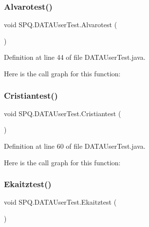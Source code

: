 \subsubsection{\texorpdfstring{Alvarotest()}{Alvarotest()}}
{\footnotesize\ttfamily void S\+P\+Q.\+D\+A\+T\+A\+User\+Test.\+Alvarotest (\begin{DoxyParamCaption}{ }\end{DoxyParamCaption})}



Definition at line 44 of file D\+A\+T\+A\+User\+Test.\+java.

Here is the call graph for this function\+:
\mbox{\label{class_s_p_q_1_1_d_a_t_a_user_test_a7defc94d9391e6721dee5c627f75e1fb}} 
\subsubsection{\texorpdfstring{Cristiantest()}{Cristiantest()}}
{\footnotesize\ttfamily void S\+P\+Q.\+D\+A\+T\+A\+User\+Test.\+Cristiantest (\begin{DoxyParamCaption}{ }\end{DoxyParamCaption})}



Definition at line 60 of file D\+A\+T\+A\+User\+Test.\+java.

Here is the call graph for this function\+:
\mbox{\label{class_s_p_q_1_1_d_a_t_a_user_test_a04242b7156b6bb7828bd569de8027fad}} 
\subsubsection{\texorpdfstring{Ekaitztest()}{Ekaitztest()}}
{\footnotesize\ttfamily void S\+P\+Q.\+D\+A\+T\+A\+User\+Test.\+Ekaitztest (\begin{DoxyParamCaption}{ }\end{DoxyParamCaption})}



